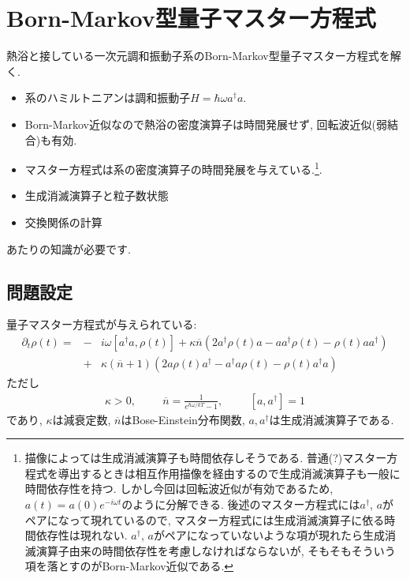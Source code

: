 \documentclass[10.5pt,a4paper]{jreport}
\begin{document}
\section{Born-Markov型量子マスター方程式}
熱浴と接している一次元調和振動子系のBorn-Markov型量子マスター方程式を解く.
\begin{itemize}
\item 系のハミルトニアンは調和振動子$H = \hbar\omega a^\dagger a$.
  
\item Born-Markov近似なので熱浴の密度演算子は時間発展せず, 回転波近似(弱結合)も有効.
  
\item マスター方程式は系の密度演算子の時間発展を与えている.\footnote{描像によっては生成消滅演算子も時間依存しそうである. 普通(?)マスター方程式を導出するときは相互作用描像を経由するので生成消滅演算子も一般に時間依存性を持つ. しかし今回は回転波近似が有効であるため, $a(t) = a(0)e^{-i\omega t}$のように分解できる. 後述のマスター方程式には$a^\dagger$, $a$がペアになって現れているので, マスター方程式には生成消滅演算子に依る時間依存性は現れない. $a^\dagger$, $a$がペアになっていないような項が現れたら生成消滅演算子由来の時間依存性を考慮しなければならないが, そもそもそういう項を落とすのがBorn-Markov近似である. }.
\end{itemize}
\begin{itemize}
\item 生成消滅演算子と粒子数状態
  
\item 交換関係の計算  
\end{itemize}
あたりの知識が必要です.
\subsection{問題設定}
量子マスター方程式が与えられている:
\begin{eqnarray}
  \nonumber  \partial_t\rho(t) = &-&i\omega[a^\dagger a, \rho(t)] + \kappa\overline{n}(2a^\dagger\rho(t)a - aa^\dagger\rho(t) - \rho(t)aa^\dagger)\\
  &+&\kappa(\overline{n} + 1)(2a\rho(t)a^\dagger - a^\dagger a\rho(t) - \rho(t)a^\dagger a)\label{master}
\end{eqnarray}
ただし
\begin{eqnarray}
  \kappa > 0,\hspace{1cm} \overline{n} = \frac{1}{e^{\hbar\omega/kT}-1},\hspace{1cm} [a, a^\dagger] = 1
\end{eqnarray}
であり, $\kappa$は減衰定数, $\overline{n}$はBose-Einstein分布関数, $a, a^\dagger$は生成消滅演算子である.
\end{document}
